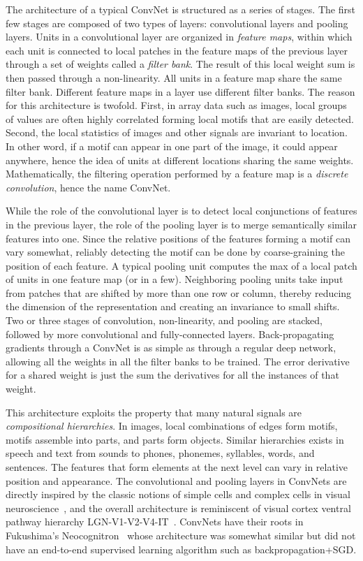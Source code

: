 \documentclass[10pts]{article}
\begin{document}
The architecture of a typical ConvNet is 
structured as a series of stages. The first few stages are composed of two
types of layers: convolutional layers and pooling layers. Units in a
convolutional layer are organized in {\em feature maps}, within which
each unit is connected to local patches in the feature maps of the
previous layer through a set of weights called a {\em filter
  bank}. The result of this local weight sum is then passed through a
non-linearity.  All units in a feature map share the same filter
bank. Different feature maps in a layer use different filter banks. The
reason for this architecture is twofold. First, in array data such as
images, local groups of values are often highly correlated forming
local motifs that are easily detected. Second, the local statistics of
images and other signals are invariant to location. In other word, if
a motif can appear in one part of the image, it could appear anywhere,
hence the idea of units at different locations sharing the same
weights.  Mathematically, the filtering operation performed by a
feature map is a {\em discrete convolution}, hence the name
ConvNet. 

While the role of the convolutional layer is to detect local
conjunctions of features in the previous layer, the role of the
pooling layer is to merge semantically similar features into
one. Since the relative positions of the features forming a motif can
vary somewhat, reliably detecting the motif can be done by
coarse-graining the position of each feature. A typical pooling unit
computes the max of a local patch of units in one feature map (or in a
few). Neighboring pooling units take input from patches that are
shifted by more than one row or column, thereby reducing the dimension
of the representation and creating an invariance to small shifts.  Two
or three stages of convolution, non-linearity, and pooling are
stacked, followed by more convolutional and fully-connected layers.
Back-propagating gradients through a ConvNet is as simple
as through a regular deep network, allowing all the weights in all the
filter banks to be trained. The error derivative for a shared weight
is just the sum the derivatives for all the instances of that weight.

This architecture exploits the property that many natural signals are
{\em compositional hierarchies}. In images, local combinations of
edges form motifs, motifs assemble into parts, and parts form objects.
Similar hierarchies exists in speech and text from sounds to phones,
phonemes, syllables, words, and sentences. The features that form
elements at the next level can vary in relative position and
appearance. The convolutional and pooling layers in ConvNets are
directly inspired by the classic notions of simple cells and complex
cells in visual neuroscience~\cite{Hubel62}, and the overall
architecture is reminiscent of visual cortex ventral pathway hierarchy
LGN-V1-V2-V4-IT~\citep{Felleman+VanEssen-1991}. ConvNets have their roots in
Fukushima's Neocognitron~\citep{fukushima-82} whose architecture was
somewhat similar but did not have an end-to-end supervised learning
algorithm such as backpropagation+SGD.
\end{document}
